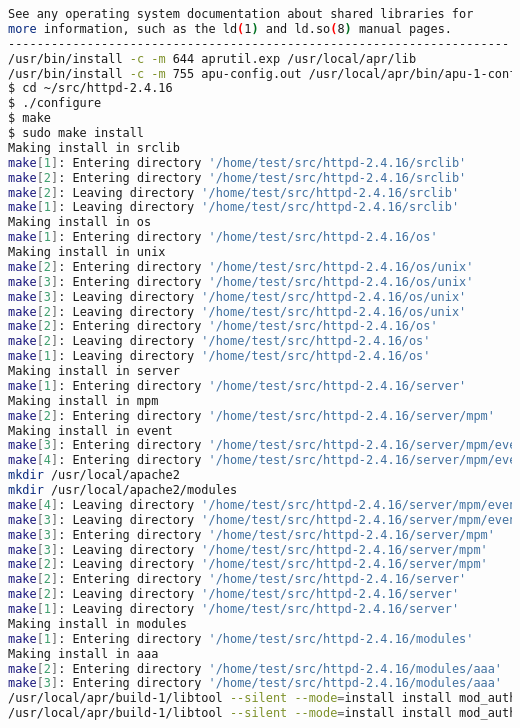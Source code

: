 \begin{lstlisting}[language=bash]
See any operating system documentation about shared libraries for
more information, such as the ld(1) and ld.so(8) manual pages.
----------------------------------------------------------------------
/usr/bin/install -c -m 644 aprutil.exp /usr/local/apr/lib
/usr/bin/install -c -m 755 apu-config.out /usr/local/apr/bin/apu-1-config
$ cd ~/src/httpd-2.4.16
$ ./configure
$ make
$ sudo make install
Making install in srclib
make[1]: Entering directory '/home/test/src/httpd-2.4.16/srclib'
make[2]: Entering directory '/home/test/src/httpd-2.4.16/srclib'
make[2]: Leaving directory '/home/test/src/httpd-2.4.16/srclib'
make[1]: Leaving directory '/home/test/src/httpd-2.4.16/srclib'
Making install in os
make[1]: Entering directory '/home/test/src/httpd-2.4.16/os'
Making install in unix
make[2]: Entering directory '/home/test/src/httpd-2.4.16/os/unix'
make[3]: Entering directory '/home/test/src/httpd-2.4.16/os/unix'
make[3]: Leaving directory '/home/test/src/httpd-2.4.16/os/unix'
make[2]: Leaving directory '/home/test/src/httpd-2.4.16/os/unix'
make[2]: Entering directory '/home/test/src/httpd-2.4.16/os'
make[2]: Leaving directory '/home/test/src/httpd-2.4.16/os'
make[1]: Leaving directory '/home/test/src/httpd-2.4.16/os'
Making install in server
make[1]: Entering directory '/home/test/src/httpd-2.4.16/server'
Making install in mpm
make[2]: Entering directory '/home/test/src/httpd-2.4.16/server/mpm'
Making install in event
make[3]: Entering directory '/home/test/src/httpd-2.4.16/server/mpm/event'
make[4]: Entering directory '/home/test/src/httpd-2.4.16/server/mpm/event'
mkdir /usr/local/apache2
mkdir /usr/local/apache2/modules
make[4]: Leaving directory '/home/test/src/httpd-2.4.16/server/mpm/event'
make[3]: Leaving directory '/home/test/src/httpd-2.4.16/server/mpm/event'
make[3]: Entering directory '/home/test/src/httpd-2.4.16/server/mpm'
make[3]: Leaving directory '/home/test/src/httpd-2.4.16/server/mpm'
make[2]: Leaving directory '/home/test/src/httpd-2.4.16/server/mpm'
make[2]: Entering directory '/home/test/src/httpd-2.4.16/server'
make[2]: Leaving directory '/home/test/src/httpd-2.4.16/server'
make[1]: Leaving directory '/home/test/src/httpd-2.4.16/server'
Making install in modules
make[1]: Entering directory '/home/test/src/httpd-2.4.16/modules'
Making install in aaa
make[2]: Entering directory '/home/test/src/httpd-2.4.16/modules/aaa'
make[3]: Entering directory '/home/test/src/httpd-2.4.16/modules/aaa'
/usr/local/apr/build-1/libtool --silent --mode=install install mod_authn_file.la /usr/local/apache2/modules/
/usr/local/apr/build-1/libtool --silent --mode=install install mod_authn_dbm.la /usr/local/apache2/modules/

\end{lstlisting}
